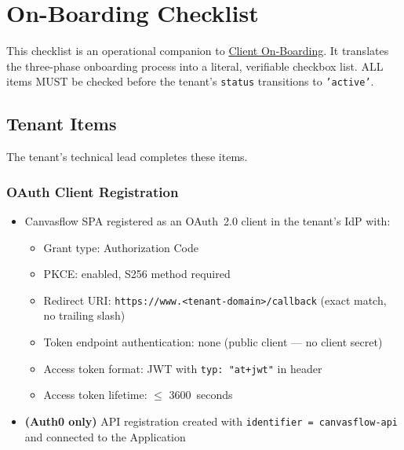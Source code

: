 
\section{On-Boarding Checklist}

\begin{notebox}
This checklist is an operational companion to \hyperref[sec:on-boarding]{Client On-Boarding}. It translates
the three-phase onboarding process into a literal, verifiable checkbox list.
ALL items MUST be checked before the tenant's \texttt{status} transitions to
\texttt{'active'}.
\end{notebox}

\subsection*{Tenant Items}

\begin{notebox}
The tenant's technical lead completes these items.
\end{notebox}

\subsubsection*{OAuth Client Registration}

\begin{itemize}[label=$\square$, leftmargin=2em]
  \item Canvasflow SPA registered as an OAuth~2.0 client in the tenant's IdP with:
    \begin{itemize}[label=$\square$, leftmargin=2em]
      \item Grant type: Authorization Code
      \item PKCE: enabled, S256 method required
      \item Redirect URI: \texttt{https://www.<tenant-domain>/callback} (exact match, no
        trailing slash)
      \item Token endpoint authentication: none (public client --- no client secret)
      \item Access token format: JWT with \texttt{typ: "at+jwt"} in header
      \item Access token lifetime: $\leq$ 3600~seconds
    \end{itemize}
  \item \textbf{(Auth0 only)} API registration created with
    \texttt{identifier = canvasflow-api} and connected to the Application
\end{itemize}

